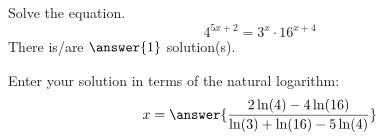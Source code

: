 \documentclass{ximera}
\author{Bobby Ramsey}
\begin{document}
\begin{exercise}
	Solve the equation.
	\[ 4^{5x+2} = 3^x \cdot 16^{x+4} \]
	There is/are $\answer{1}$ solution(s).
	\begin{exercise}
		Enter your solution in terms of the natural logarithm: \[x = \answer{ \frac{2\ln(4) - 4\ln(16)}{\ln(3)+\ln(16)-5\ln(4)} }\]
	\end{exercise}
\end{exercise}
\end{document}
